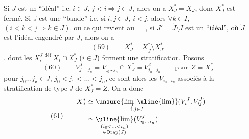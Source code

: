 Si $J$ est un ``idéal'' i.e. $i\in J$, $j<i\Longrightarrow j\in J$,
alors on a $X_J^*=X_J$, donc $X_J^*$ est fermé.
Si $J$ est une ``bande'' i.e. si $i,j\in J$, $i<j$,
alors $\forall k\in I$, $(i<k<j\Longrightarrow k\in J)$,
ou ce qui revient au $=$, si $J'=\widetilde J\setminus J$ est
un ``idéal'', où $\widetilde J$ est l'idéal engendré par $J$,
alors on a
\[
(59)\qquad X_J^*=X_{\widetilde J}^*\setminus X_{J'}^*
\]
.
dont les $X_i^J\overset{\mathrm{déf}}{=}X_i\cap X_J^*$ ($i\in J$)
forment une stratification. Posons
\[
(60)\qquad V_{j_0\ldots j_n}^J
=V_{j_0\ldots j_n}\cap X_J^*=V_{j_0\ldots j_n}^Z
\qquad\text{pour }Z=X_J^*
\]
pour $j_0\ldots j_n\in J$, $j_0<j_1<\ldots<j_n$,
ce sont alors les $V_{i_0\ldots i_n}$ associés à la stratification
de type $J$ de $X_J^*=Z$. On a donc
\[
(61)\qquad\begin{aligned}
X_J^*&\simeq\underset{i,j\in J}{\unsure{\varinjlim|\uline{\lim}}}
(V_i^J,V_{ij}^J)\\
&\simeq\underset{\substack{(i_0<\ldots<i_n)\\\in\operatorname{Drap}(J)}}{\uline{\lim}}
(V_{i_0\ldots i_n}^J)
\end{aligned}
\]
